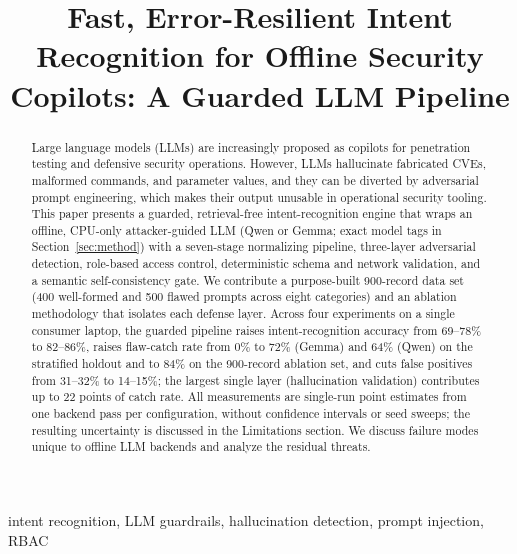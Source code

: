 \documentclass[conference]{IEEEtran}
\begin{document}
\title{Fast, Error-Resilient Intent Recognition for Offline Security Copilots: A Guarded LLM Pipeline}

\author{
}

\maketitle

\begin{abstract}
Large language models (LLMs) are increasingly proposed as copilots for penetration testing and defensive security operations. However, LLMs hallucinate fabricated CVEs, malformed commands, and parameter values, and they can be diverted by adversarial prompt engineering, which makes their output unusable in operational security tooling. This paper presents a guarded, retrieval-free intent-recognition engine that wraps an offline, CPU-only attacker-guided LLM (Qwen or Gemma; exact model tags in Section~\ref{sec:method}) with a seven-stage normalizing pipeline, three-layer adversarial detection, role-based access control, deterministic schema and network validation, and a semantic self-consistency gate. We contribute a purpose-built 900-record data set (400 well-formed and 500 flawed prompts across eight categories) and an ablation methodology that isolates each defense layer. Across four experiments on a single consumer laptop, the guarded pipeline raises intent-recognition accuracy from 69--78\% to 82--86\%, raises flaw-catch rate from $0\%$ to 72\% (Gemma) and 64\% (Qwen) on the stratified holdout and to 84\% on the 900-record ablation set, and cuts false positives from 31--32\% to 14--15\%; the largest single layer (hallucination validation) contributes up to 22 points of catch rate. All measurements are single-run point estimates from one backend pass per configuration, without confidence intervals or seed sweeps; the resulting uncertainty is discussed in the Limitations section. We discuss failure modes unique to offline LLM backends and analyze the residual threats.
\end{abstract}

\begin{IEEEkeywords}
intent recognition, LLM guardrails, hallucination detection, prompt injection, RBAC
\end{IEEEkeywords}
\end{document}
